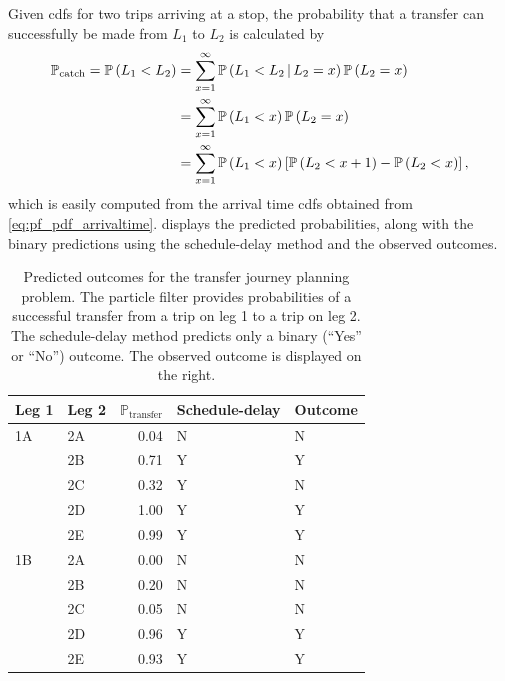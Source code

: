 Given \glspl{cdf} for two trips arriving at a stop, the probability that a transfer can successfully be made from $L_1$ to $L_2$ is calculated by
\begin{equation}
\label{eq:eta_total_prob}
\begin{split}
\mathbb{P}_\text{catch} =
\mathbb{P}\left(L_1 < L_2\right) &= \sum_{x=1}^{\infty} \mathbb{P}\left(L_1 < L_2\,|\,L_2 = x\right)\mathbb{P}\left(L_2=x\right) \\
  &= \sum_{x=1}^\infty
    \mathbb{P}\left(L_1 < x\right) \mathbb{P}\left(L_2=x\right) \\
  &= \sum_{x=1}^\infty
    \mathbb{P}\left(L_1 < x\right) \left[
      \mathbb{P}\left(L_2 < x + 1\right) - \mathbb{P}\left(L_2 < x\right)
    \right],
\end{split}
\end{equation}
which is easily computed from the arrival time \glspl{cdf} obtained from \cref{eq:pf_pdf_arrivaltime}.  displays the predicted probabilities, along with the binary predictions using the schedule-delay method and the observed outcomes.


\begin{knitrout}\small
{}\color{fgcolor}\begin{table}

\caption[Predicted outcomes for the transfer journey planning problem. The particle filter provides probabilities of a successful transfer]{\label{tab:eta_journey_transfer_res}Predicted outcomes for the transfer journey planning problem. The particle filter provides probabilities of a successful transfer from a trip on leg 1 to a trip on leg 2. The schedule-delay method predicts only a binary (``Yes'' or ``No'') outcome. The observed outcome is displayed on the right.}
\centering
\fontsize{8}{10}\selectfont
\begin{tabular}[t]{llrll}
\toprule
Leg 1 & Leg 2 & $\mathbb{P}_\text{transfer}$ & Schedule-delay & Outcome\\
\midrule
1A & 2A & 0.04 & N & N\\
 & 2B & 0.71 & Y & Y\\
 & 2C & 0.32 & Y & N\\
 & 2D & 1.00 & Y & Y\\
 & 2E & 0.99 & Y & Y\\
\midrule
1B & 2A & 0.00 & N & N\\
 & 2B & 0.20 & N & N\\
 & 2C & 0.05 & N & N\\
 & 2D & 0.96 & Y & Y\\
 & 2E & 0.93 & Y & Y\\
\bottomrule
\end{tabular}
\end{table}


\end{knitrout}


